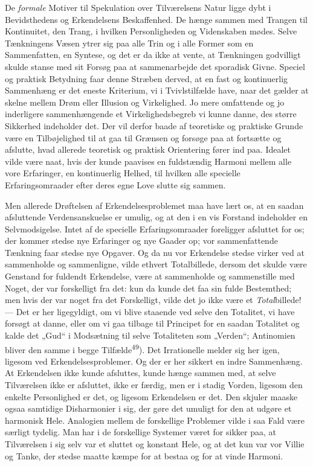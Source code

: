 \documentclass[12pt,a4paper,openany]{book}
\newcommand{\opage}[1]{\marginnote{\footnotesize\textit{[#1]}}}
\begin{document}
\opage{54}De \textit{formale} Motiver til Spekulation over Tilværelsens Natur
ligge dybt i Bevidsthedens og Erkendelsens Beskaffenhed. De hænge sammen med
Trangen til Kontinuitet, den Trang, i hvilken Personligheden og Videnskaben
mødes. Selve Tænkningens Væsen ytrer sig paa alle Trin og i alle Former som en
Sammenfatten, en Syntese, og det er da ikke at vente, at Tænkningen godvilligt
skulde stanse med sit Forsøg paa at sammenarbejde det sporadisk Givne. Speciel
og praktisk Betydning faar denne Stræben derved, at en fast og kontinuerlig
Sammenhæng er det eneste Kriterium, vi i Tvivlstilfælde have, naar det gælder
at skelne mellem Drøm eller Illusion og Virkelighed. Jo mere omfattende og jo
inderligere sammenhængende et Virkelighedsbegreb vi kunne danne, des større
Sikkerhed indeholder det. Der vil derfor baade af teoretiske og praktiske
Grunde være en Tilbøjelighed til at gaa til Grænsen og forsøge paa at fortsætte
og afslutte, hvad allerede teoretisk og praktisk Orientering fører ind paa.
Idealet vilde være naat, hvis der kunde paavises en fuldstændig Harmoni mellem
alle vore Erfaringer, en kontinuerlig Helhed, til hvilken alle specielle
Erfaringsomraader efter deres egne Love slutte sig sammen.

Men allerede Drøftelsen af Erkendelsesproblemet maa have lært os, at en saadan
afsluttende Verdensanskuelse er umulig, og at den i en vis Forstand indeholder
en Selvmodsigelse. Intet af de specielle Erfaringsomraader foreligger afsluttet
for os; der kommer stedse nye Erfaringer og nye Gaader op; vor sammenfattende
Tænkning faar stedse nye Opgaver. Og da nu vor Erkendelse stedse virker ved at
sammenholde og sammenligne, vilde ethvert Totalbillede, dersom det skulde være
Genstand for fuldendt Erkendelse, være at sammenholde og sammenstille med
Noget, der var forskelligt fra det: kun da kunde det faa sin fulde Bestemthed;
men hvis der var noget fra det Forskelligt, vilde det jo ikke være et
\textit{Total}billede! --- Det er her ligegyldigt, om vi blive staaende ved
selve den Totalitet, vi have forsøgt at danne, eller om vi gaa tilbage til
Principet for en saadan Totalitet og kalde det „Gud“ i Modsætning til selve
Totaliteten som „Verden“; Antinomien bliver den samme i begge
Tilfælde\textsuperscript{49}). Det Irrationelle melder sig her igen, ligesom ved
\opage{55}Erkendelsesproblemer. Og der er her sikkert en indre Sammenhæng. At
Erkendelsen ikke kunde afsluttes, kunde hænge sammen med, at selve Tilværelsen
ikke er afsluttet, ikke er færdig, men er i stadig Vorden, ligesom den enkelte
Personlighed er det, og ligesom Erkendelsen er det. Den skjuler maaske ogsaa
samtidige Disharmonier i sig, der gøre det umuligt for den at udgøre et
harmonisk Hele. Analogien mellem de forskellige Problemer vilde i saa Fald være
særligt tydelig. Man har i de forskellige Systemer været for sikker paa, at
Tilværelsen i sig selv var et sluttet og konstant Hele, og at det kun var vor
Villie og Tanke, der stedse maatte kæmpe for at bestaa og for at vinde Harmoni.
\end{document}
